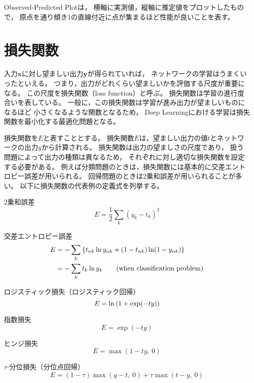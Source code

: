 \documentclass[class=jsarticle, crop=false, dvipdfmx, fleqn]{standalone}
\begin{document}
Observed-Predicted Plotは，
横軸に実測値，縦軸に推定値をプロットしたもので，
原点を通り傾き1の直線付近に点が集まるほど性能が良いことを表す。



\section{損失関数}
\label{sec:loss_function}

入力$\bm{x}$に対し望ましい出力$\bm{y}$が得られていれば，
ネットワークの学習はうまくいったといえる。
つまり，出力がどれくらい望ましいかを評価する尺度が重要になる。
この尺度を損失関数（loss function）と呼ぶ。
損失関数は学習の進行度合いを表している。
一般に，この損失関数は学習が進み出力が望ましいものになるほど
小さくなるような関数となるため，
Deep Learningにおける学習は損失関数を最小化する最適化問題となる。

損失関数を$E$と表すこととする。
損失関数$E$は，望ましい出力の値$t$とネットワークの出力$y$から計算される。
損失関数は出力の望ましさの尺度であり，
扱う問題によって出力の種類は異なるため，
それぞれに対し適切な損失関数を設定する必要がある。
例えば分類問題のときは，損失関数には基本的に交差エントロピー誤差が用いられる。
回帰問題のときは2乗和誤差が用いられることが多い。
以下に損失関数の代表例の定義式を列挙する。

2乗和誤差
\begin{equation}
E = \frac{1}{2} \sum_k (y_k - t_k)^2
\end{equation}

交差エントロピー誤差
\begin{align}
E & = - \sum_k \qty{ t_{nk} \ln y_{nk} + (1 - t_{nk}) \ln (1 - y_{nk}) } \\
	& =  - \sum_k t_k \ln y_k  \qquad (\text{when classification problem})
\end{align}

ロジスティック損失（ロジスティック回帰）
\begin{equation}
E = \ln\qty(1 + \exp(-ty))
\end{equation}

指数損失
\begin{equation}
E = \exp(-ty)
\end{equation}

ヒンジ損失
\begin{equation}
E = \max(1 - ty,\ 0)
\end{equation}

$\tau$-分位損失（分位点回帰）
\begin{equation}
E = (1 - \tau) \max(y-t,\ 0) + \tau \max(t-y,\ 0)
\end{equation}
\end{document}

